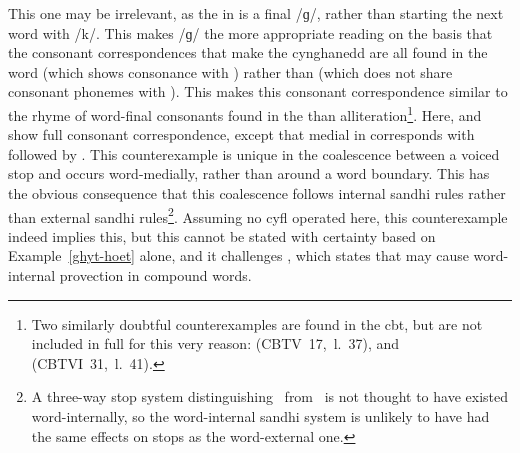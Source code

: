 This one may be irrelevant, as the  in  is a final /ɡ/, rather than starting the next word with /k/. This makes /ɡ/  the more appropriate reading on the basis that the consonant correspondences that make the cynghanedd are all found in the word  (which shows consonance with ) rather than  (which does not share consonant phonemes with ). This makes this consonant correspondence similar to the rhyme of word-final consonants found in the  than alliteration\footnote{Two similarly doubtful counterexamples are found in the \gls{cbt}, but are not included in full for this very reason:  (\acrshort{CBTV}~17,~l.~37), and  (\acrshort{CBTVI}~31,~l.~41).}. 
Here,  and  show full consonant correspondence, except that medial  in  corresponds with  followed by . This counterexample is unique in the coalescence between a voiced stop and  occurs word-medially, rather than around a word boundary. This has the obvious consequence that this coalescence follows internal sandhi rules rather than external sandhi rules\footnote{A three-way stop system distinguishing \xD\ from \lT\ is not thought to have existed word-internally, so the word-internal sandhi system is unlikely to have had the same effects on stops as the word-external one.}.  Assuming no \gls{cyfl} operated here, this counterexample indeed implies this, but this cannot be stated with certainty based on Example~\ref{ghyt-hoet} alone, and it challenges \textcite[\S 17b]{evans_grammar_1964}, which states that  may cause word-internal provection in compound words. %

